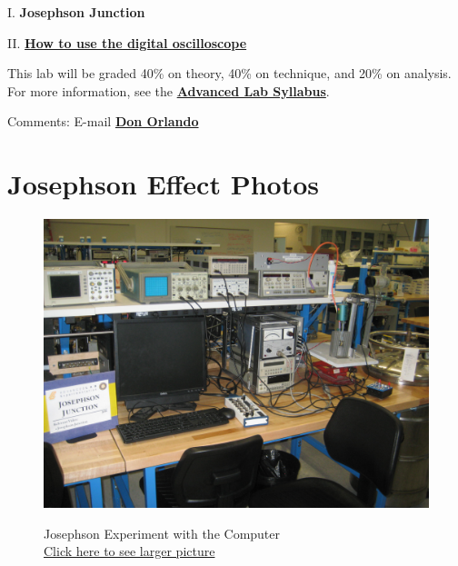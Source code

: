 \documentclass{../lab}
\begin{document}
I. \textbf{Josephson Junction}

II. \href{http://experimentationlab.berkeley.edu/node/104}{\textbf{How to use the digital oscilloscope}}

This lab will be graded 40\% on theory, 40\% on technique, and 20\% on analysis. For more information, see the \href{\AdvancedLabSyllabus}{\textbf{Advanced Lab Syllabus}}.

Comments: E-mail \href{\MailDonOrlando}{\textbf{Don Orlando}}

\section{Josephson Effect Photos}

\noindent
\begin{figure}[!htb]
  \href{http://experimentationlab.berkeley.edu/sites/default/files/images/JOS_3507.jpg}{\includegraphics[width=\linewidth,keepaspectratio]{images/JOS_3507.jpg}}
  \caption{Josephson Experiment with the Computer \\ \href{http://experimentationlab.berkeley.edu/sites/default/files/images/JOS_3507.jpg}{Click here to see larger picture}}
  \label{fig:JOS_3507.jpg}
\endminipage\hfill
{}

\end{figure}
\end{document}
